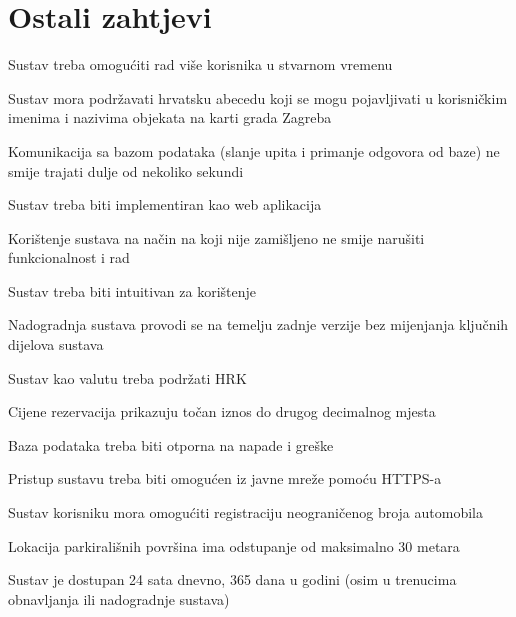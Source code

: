 				\eject
	
		\section{Ostali zahtjevi}
			 
			 \begin{packed_item}
			 	
			 	\item  Sustav treba omogućiti rad više korisnika u stvarnom vremenu 
			 	\item  Sustav mora podržavati hrvatsku abecedu koji se mogu pojavljivati u korisničkim imenima i nazivima objekata na karti grada Zagreba
			 	\item  Komunikacija sa bazom podataka (slanje upita i primanje odgovora od baze) ne smije trajati dulje od nekoliko sekundi
			 	\item  Sustav treba biti implementiran kao web aplikacija
			 	\item  Korištenje sustava na način na koji nije zamišljeno ne smije narušiti funkcionalnost i rad
			 	\item  Sustav treba biti intuitivan za korištenje
			 	\item  Nadogradnja sustava provodi se na temelju zadnje verzije bez mijenjanja ključnih dijelova sustava
			 	\item Sustav kao valutu treba podržati HRK
			 	\item Cijene rezervacija prikazuju točan iznos do drugog decimalnog mjesta
			 	\item Baza podataka treba biti otporna na napade i greške
			 	\item Pristup sustavu treba biti omogućen iz javne mreže pomoću HTTPS-a
			 	\item Sustav korisniku mora omogućiti registraciju neograničenog broja automobila
			 	\item Lokacija parkirališnih površina ima odstupanje od maksimalno 30 metara
			 	\item Sustav je dostupan 24 sata dnevno, 365 dana u godini (osim u trenucima obnavljanja ili nadogradnje sustava)
			 	
			 \end{packed_item}
			 
	
	